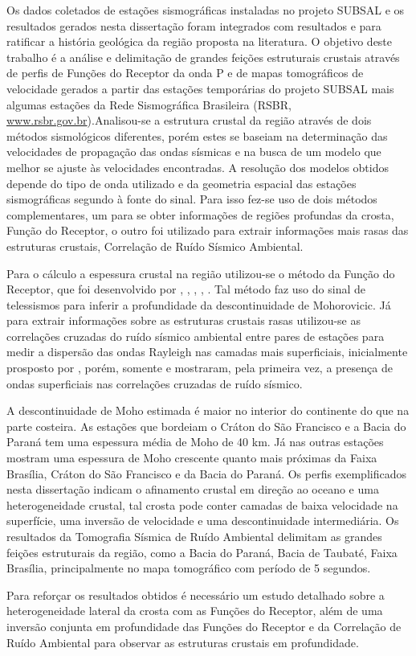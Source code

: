 Os dados coletados de estações sismográficas instaladas no projeto SUBSAL e os resultados gerados nesta dissertação foram integrados com resultados \cite{flora_solon_ancient_2013} e \cite{Silva_2014} para ratificar a história geológica da região proposta na literatura. O objetivo deste trabalho é a análise e delimitação de grandes feições estruturais crustais através de perfis de Funções do Receptor da onda P e de mapas tomográficos de velocidade gerados a partir das estações temporárias do projeto SUBSAL mais algumas estações da Rede Sismográfica Brasileira (RSBR, \url{www.rsbr.gov.br}).Analisou-se a estrutura crustal da região através de dois métodos sismológicos diferentes, porém estes se baseiam na determinação das velocidades de propagação das ondas sísmicas e na busca de um modelo que melhor se ajuste às velocidades encontradas. A resolução dos modelos obtidos depende do tipo de onda utilizado e da geometria espacial das estações sismográficas segundo à fonte do sinal. Para isso fez-se uso de dois métodos complementares, um para se obter informações de regiões profundas da crosta, Função do Receptor, o outro foi utilizado para extrair informações mais rasas das estruturas crustais, Correlação de Ruído Sísmico Ambiental.

Para o cálculo a espessura crustal na região utilizou-se o método da Função do Receptor, que foi desenvolvido por \cite{clayton_source_1976}, \cite{Langston_1977}, \cite{ammon_isolation_1991}, \cite{cassidy_numerical_1992}, \cite{Zhu_Kanamori_2000}. Tal método faz uso do sinal de telessismos para inferir a profundidade da descontinuidade de Mohorovicic. Já para extrair informações sobre as estruturas crustais rasas utilizou-se as correlações cruzadas do ruído sísmico ambiental entre pares de estações para medir a dispersão das ondas Rayleigh nas camadas mais superficiais, inicialmente prosposto por \cite{aki_space_1957}, porém, somente \cite{campillo_long-range_2003}  e \cite{shapiro_emergence_2004} mostraram, pela primeira vez, a  presença de ondas superficiais nas correlações cruzadas de ruído sísmico.

A descontinuidade de Moho estimada é maior no interior do continente do que na parte costeira. As estações que bordeiam o Cráton do São Francisco e a Bacia do Paraná tem uma espessura média de Moho de 40 km. Já nas outras estações mostram uma espessura de Moho crescente quanto mais próximas da Faixa Brasília, Cráton do São Francisco e da Bacia do Paraná. Os perfis exemplificados nesta dissertação indicam o afinamento crustal em direção ao oceano e uma heterogeneidade crustal, tal crosta pode conter camadas de baixa velocidade na superfície, uma inversão de velocidade e uma descontinuidade intermediária. Os resultados da Tomografia Sísmica de Ruído Ambiental delimitam as grandes feições estruturais da região, como a Bacia do Paraná, Bacia de Taubaté, Faixa Brasília, principalmente no mapa tomográfico com período de 5 segundos.

Para reforçar os resultados obtidos é necessário um estudo detalhado sobre a heterogeneidade lateral da crosta com as Funções do Receptor, além de uma inversão conjunta em profundidade das Funções do Receptor e da Correlação de Ruído Ambiental para observar as estruturas crustais em profundidade.
